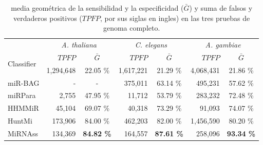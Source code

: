 \begin{table}[tpb]
	\footnotesize
	\centering
	\caption[Resultados en genomá completo]{media geométrica de la sensibilidad y la especificidad ($\bar{G}$) y suma de falsos y verdaderos positivos 
		($TPFP$, por sus siglas en ingles) en las tres pruebas de genoma completo.
	\label{tab:wholegenome}}
	\begin{tabular}{@{}lrcrcrc@{}} \toprule
		&	\multicolumn{2}{c}{\textit{A. thaliana}}
		&	\multicolumn{2}{c}{\textit{C. elegans}}
		&	\multicolumn{2}{c}{\textit{A. gambiae}} \\
		\multirow{2}{*}{Classifier}	&	 $TPFP$		&	 $\bar{G}$
						&	 $TPFP$			&	 $\bar{G}$
						&	 $TPFP$			&	 $\bar{G}$	\\\midrule
		{\small Mirident}	&	 1,294,648		&	 22.05 \%
					&	 1,617,221		&	 21.29 \%
					&	 4,068,431		&	 21.86 \%	\\
		{\small miR-BAG}	&	 -			&	 -
					&	 375,011		&	 63.14 \%
					&	 495,231		&	 57.62 \%	\\
		{\small miRPara}	&	 2,755			&	 47.95 \%
					&	 11,712			&	 53.79 \%
					&	 283,232		&	 72.48 \%	\\
		{\small HHMMiR}		&	 45,104			&	 69.07 \%
					&	 40,318			&	 73.29 \%
					&	 91,093			&	 74.07 \%	\\
		{\small HuntMi}		&	 173,906		&	 84.00 \%
					&	 462,203		&	 82.00 \%
					&	 1,456,590		&	 80.20 \%	\\
		{\small MiRNAss}	&	134,369		&	\textbf{84.82 \%}
					&	 164,557		&	 \textbf{87.61 \%}
					&	 258,096		&	 \textbf{93.34 \%}	\\\bottomrule
	\end{tabular}
\end{table}
